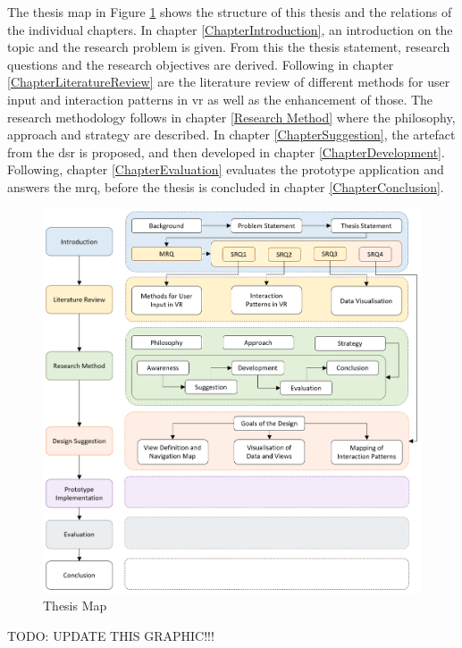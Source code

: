 The thesis map in Figure \ref{fig:thesismap} shows the structure of this thesis and the relations of the individual chapters. In chapter \ref{ChapterIntroduction}, an introduction on the topic and the research problem is given. From this the thesis statement, research questions and the research objectives are derived. Following in chapter \ref{ChapterLiteratureReview} are the literature review of different methods for user input and interaction patterns in \gls{vr} as well as the enhancement of those. The research methodology follows in chapter \ref{Research Method} where the philosophy, approach and strategy are described. In chapter \ref{ChapterSuggestion}, the artefact from the \gls{dsr} is proposed, and then developed in chapter \ref{ChapterDevelopment}. Following, chapter \ref{ChapterEvaluation} evaluates the prototype application and answers the \gls{mrq}, before the thesis is concluded in chapter \ref{ChapterConclusion}.
\begin{figure}[pt!]
	\begin{center}
		\includegraphics[width=14cm]{03_Figures/06_Introduction/ThesisMap.png}
		\caption{Thesis Map}
		\label{fig:thesismap}
	\end{center}
\end{figure}

TODO: UPDATE THIS GRAPHIC!!!





